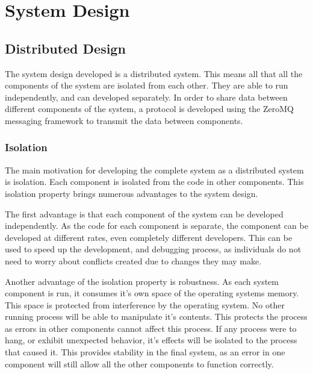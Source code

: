 
\chapter{System Design} %
\label{sec:design}


\ifpdf
    \graphicspath{{4/figures/PNG/}{4/figures/PDF/}{4/figures/}}
\else
    \graphicspath{{4/figures/EPS/}{4/figures/}}
\fi


\section{Distributed Design}

The system design developed is a distributed system. This means all that all the components of the system are isolated from each other. They are able to run independently, and can developed separately. In order to share data between different components of the system, a protocol is developed using the ZeroMQ messaging framework to transmit the data between components.

\subsection{Isolation}

The main motivation for developing the complete system as a distributed system is isolation. Each component is isolated from the code in other components. This isolation property brings numerous advantages to the system design. 

The first advantage is that each component of the system can be developed independently. As the code for each component is separate, the component can be developed at different rates, even completely different developers. This can be used to speed up the development, and debugging process, as individuals do not need to worry about conflicts created due to changes they may make.

Another advantage of the isolation property is robustness. As each system component is run, it consumes it's own space of the operating systems memory. This space is protected from interference by the operating system. No other running process will be able to manipulate it's contents. This protects the process as errors in other components cannot affect this process. If any process were to hang, or exhibit unexpected behavior, it's effects will be isolated to the process that caused it. This provides stability in the final system, as an error in one component will still allow all the other components to function correctly.

